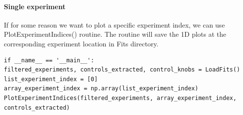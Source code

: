 \documentclass[12pt, twoside, a4paper]{article}
\begin{document}
\paragraph{Single experiment}
If for some reason we want to plot a specific experiment index, we can use PlotExperimentIndices() routine. The routine will save the 1D plots at the corresponding experiment location in Fits directory. 
%
\begin{verbatim}
if __name__ == '__main__':
filtered_experiments, controls_extracted, control_knobs = LoadFits()
list_experiment_index = [0]
array_experiment_index = np.array(list_experiment_index)
PlotExperimentIndices(filtered_experiments, array_experiment_index, controls_extracted)
\end{verbatim}
%
%
\end{document}
